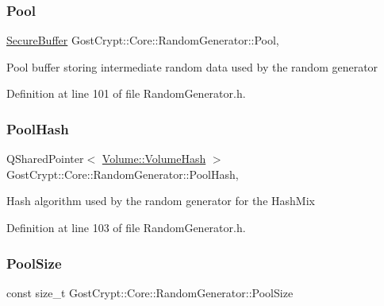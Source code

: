 \subsubsection{\texorpdfstring{Pool}{Pool}}
{\footnotesize\ttfamily \hyperlink{class_gost_crypt_1_1_secure_buffer}{Secure\+Buffer} Gost\+Crypt\+::\+Core\+::\+Random\+Generator\+::\+Pool\hspace{0.3cm}{\ttfamily [static]}, {\ttfamily [protected]}}

Pool buffer storing intermediate random data used by the random generator 

Definition at line 101 of file Random\+Generator.\+h.

\mbox{\label{class_gost_crypt_1_1_core_1_1_random_generator_ab9eeae07912df145f02a9678365d2675}} 
\subsubsection{\texorpdfstring{Pool\+Hash}{PoolHash}}
{\footnotesize\ttfamily Q\+Shared\+Pointer$<$ \hyperlink{class_gost_crypt_1_1_volume_1_1_volume_hash}{Volume\+::\+Volume\+Hash} $>$ Gost\+Crypt\+::\+Core\+::\+Random\+Generator\+::\+Pool\+Hash\hspace{0.3cm}{\ttfamily [static]}, {\ttfamily [protected]}}

Hash algorithm used by the random generator for the Hash\+Mix 

Definition at line 103 of file Random\+Generator.\+h.

\mbox{\label{class_gost_crypt_1_1_core_1_1_random_generator_a3bfda552ccfe4434913035282dab50cc}} 
\subsubsection{\texorpdfstring{Pool\+Size}{PoolSize}}
{\footnotesize\ttfamily const size\+\_\+t Gost\+Crypt\+::\+Core\+::\+Random\+Generator\+::\+Pool\+Size\hspace{0.3cm}{\ttfamily [static]}}

